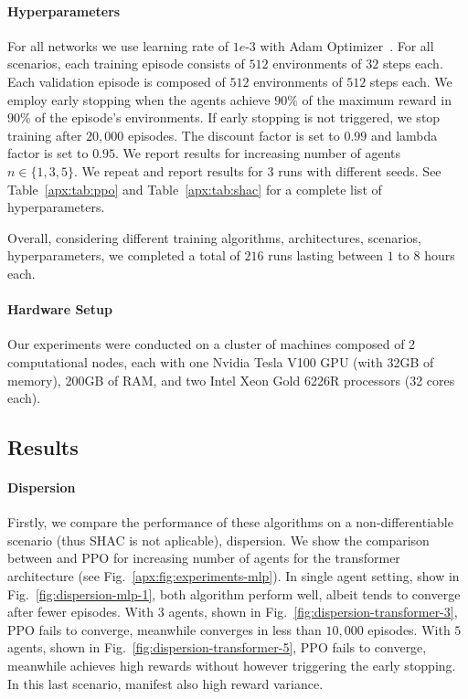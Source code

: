 \paragraph{Hyperparameters}
For all networks we use learning rate of $1e\text{-}3$ with Adam Optimizer~\cite{Kingma14}. For all scenarios, each training episode consists of $512$ environments of $32$ steps each. Each validation episode is composed of $512$ environments of $512$ steps each. We employ early stopping when the agents achieve $90\%$ of the maximum reward in $90\%$ of the episode's environments. If early stopping is not triggered, we stop training after $20,000$ episodes. The discount factor is set to $0.99$ and lambda factor is set to $0.95$. We report results for increasing number of agents $n\in\{1,3,5\}$. We repeat and report results for $3$ runs with different seeds. See Table~\ref{apx:tab:ppo} and Table~\ref{apx:tab:shac} for a complete list of hyperparameters.

Overall, considering different training algorithms, architectures, scenarios, hyperparameters, we completed a total of $216$ runs lasting between $1$ to $8$ hours each. 

\paragraph{Hardware Setup}
Our experiments were conducted on a cluster of machines composed of 2 computational nodes, each with one Nvidia Tesla V100 GPU (with 32GB of memory), 200GB of RAM, and two Intel Xeon Gold 6226R processors (32 cores each).

\subsection{Results}

\paragraph{Dispersion}
Firstly, we compare the performance of these algorithms on a non-differentiable scenario (thus SHAC is not aplicable), dispersion. We show the comparison between \fname{} and PPO for increasing number of agents for the transformer architecture (see Fig.~\ref{apx:fig:experiments-mlp}). In single agent setting, show in Fig.~\ref{fig:dispersion-mlp-1}, both algorithm perform well, albeit \fname{} tends to converge after fewer episodes. With $3$ agents, shown in Fig.~\ref{fig:dispersion-transformer-3}, PPO fails to converge, meanwhile \fname{} converges in less than $10,000$ episodes. With $5$ agents, shown in Fig.~\ref{fig:dispersion-transformer-5}, PPO fails to converge, meanwhile \fname{} achieves high rewards without however triggering the early stopping. In this last scenario, \fname{} manifest also high reward variance.

